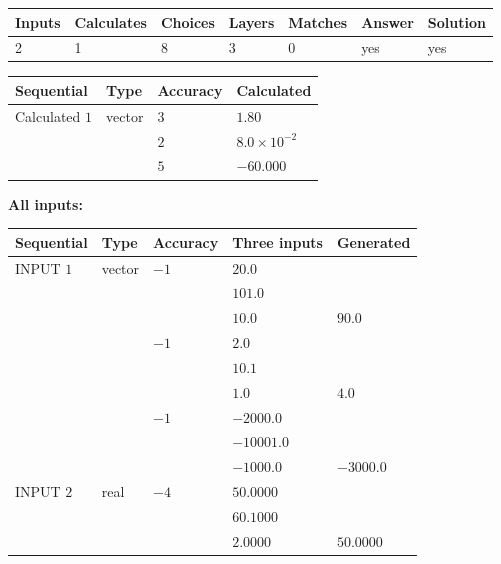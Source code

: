 \documentclass[12pt]{article}
\begin{document}
   
\noindent\begin{tabular}{|l|l|l|l|l|l|l|}
 \hline
Inputs & Calculates & Choices & Layers & Matches & Answer & Solution \\ \hline
           2 & 
           1 & 
           8
  & 
           3 & 
           0 & 
  yes & 
  yes 
  \\ \hline
 \end{tabular}
   
   
   
   
\noindent{}
   
   
  
  
\noindent\begin{tabular}{|l|l|l|l|}
\hline
 Sequential & Type & Accuracy & Calculated \\ 
\hline
 
 
  Calculated $           1$ & vector &  
  $           3 $ 
 &  $ 1.80 $ 
 \\    
  & & 
  $           2 $ 
 &  $ 8.0 \times 10^{-2} $ 
 \\    
  & & 
  $           5 $ 
 &  $ -60.000 $ 
 \\  \hline  
 \end{tabular}
   
   
   
   
\noindent\vspace{0.1in}\hspace{-0.08in} {\textbf{\Large{All inputs: }}}
   
   
  
  
\noindent\begin{tabular}{|l|l|l|l|l|}
\hline
 Sequential & Type & Accuracy & Three inputs & Generated \\ 
\hline
 
 
  INPUT $           1$ & vector & $          -1 $ & $
20.0
  $ & \\
  & & & $
101.0
  $ & \\
  & & & $
10.0
$ & $ 90.0 $ 
  \\
  & & $          -1 $ & $
2.0
  $ & \\
  & & & $
10.1
  $ & \\
  & & & $
1.0
$ & $ 4.0 $ 
  \\
  & & $          -1 $ & $
-2000.0
  $ & \\
  & & & $
-10001.0
  $ & \\
  & & & $
-1000.0
$ & $ -3000.0 $ 
 \\  \hline  
 
 
  INPUT $           2$ & real & $          -4 $ & $
 50.0000
  $ & \\
  & & &  $
 60.1000
  $ & \\
  & & &  $
 2.0000
 $ & $ 50.0000 $ 
 \\  \hline  
 \end{tabular}
   
\end{document}
